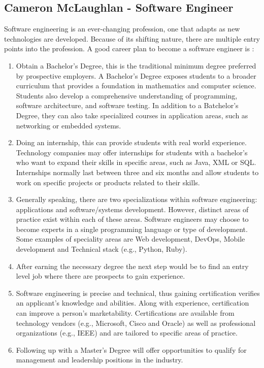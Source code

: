 \documentclass[11pt, oneside, a4paper, titlepage]{article}
\begin{document}
\subsection{Cameron McLaughlan - Software Engineer }
Software engineering is an ever-changing profession, one that adapts as new technologies are developed. Because of its shifting nature, there are multiple entry points into the profession. A good career plan to become a software engineer is : 
\begin{enumerate}
	\item
    Obtain a Bachelor’s Degree, this is the traditional minimum degree preferred by prospective employers. A Bachelor’s Degree exposes students to a broader curriculum that provides a foundation in mathematics and computer science. Students also develop a comprehensive understanding of programming, software architecture, and software testing. In addition to a Batchelor’s Degree, they can also take specialized courses in application areas, such as networking or embedded systems. 
	\item
    Doing an internship, this can provide students with real world experience. Technology companies may offer internships for students with a bachelor’s who want to expand their skills in specific areas, such as Java, XML or SQL. Internships normally last between three and six months and allow students to work on specific projects or products related to their skills. 
	\item
    Generally speaking, there are two specializations within software engineering: applications and software/systems development. However, distinct areas of practice exist within each of these areas. Software engineers may choose to become experts in a single programming language or type of development. Some examples of speciality areas are Web development, DevOps, Mobile development and Technical stack (e.g., Python, Ruby). 
	\item
    After earning the necessary degree the next step would be to find an entry level job where there are prospects to gain experience.  
	\item
    Software engineering is precise and technical, thus gaining certification verifies an applicant’s knowledge and abilities. Along with experience, certification can improve a person’s marketability. Certifications are available from technology vendors (e.g., Microsoft, Cisco and Oracle) as well as professional organizations (e.g., IEEE) and are tailored to specific areas of practice. 
	\item
    Following up with a Master’s Degree will offer opportunities to qualify for management and leadership positions in the industry.  
\end{enumerate}
\newpage
\end{document}
